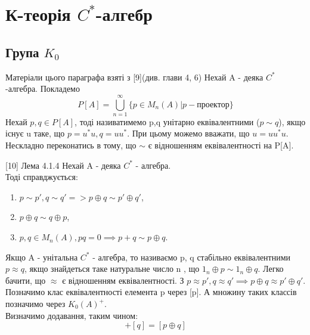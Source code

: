 \newpage
\section{К-теорія $C^*$-алгебр}

\subsection{Група $K_0$}\label{subsec:група}
Матеріали цього параграфа взяті з [9](див. глави 4, 6)
Нехай A - деяка $C^*$-алгебра.
Покладемо
\begin{equation}
    P[A] = \bigcup_{n=1}^{\infty} \{p \in M_n(A) | p - \text{проектор}\}
\end{equation}
Нехай $p,q \in P[A]$, тоді називатимемо p,q унітарно еквівалентними ($p \sim q$),
якщо існує u таке, що $p = u^* u, q = u u^*$.
При цьому можемо вважати, що $u = u u^* u$.
Нескладно переконатись в тому, що $\sim$ є відношенням еквівалентності на P[A].
\begin{theorem}{[10] Лема 4.1.4}
    Нехай A - деяка $C^*$ - алгебра. \\
    Тоді справджується:
    \begin{enumerate}
        \item $p \sim p', q \sim q' => p \oplus q \sim p' \oplus q'$,
        \item $p \oplus q \sim q \oplus p$,
        \item $p , q \in M_n(A), p q = 0 \implies p + q \sim p \oplus q$.
    \end{enumerate}
\end{theorem}

Якщо A - унітальна $C^*$ - алгебра, то називаємо p, q стабільно еквівалентними $p \approx q$, якщо
знайдеться таке натуральне число n , що $1_n \oplus p \sim 1_n \oplus q$.
Легко бачити, що $\approx$ є відношенням еквівалентності.
З $p \approx p', q \approx q' \implies p \oplus q \approx p' \oplus q'$.
Позначимо клас еквівалентності елемента p через [p].
А множину таких классів позначимо через $K_0(A)^+$. \\
Визначимо додавання, таким чином:
\begin{equation}
[p] + [q] = [p \oplus q]
\end{equation}

